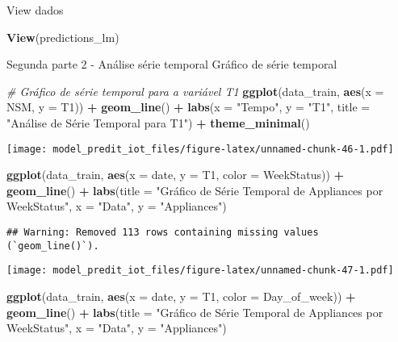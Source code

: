 \documentclass[
]{article}
\newenvironment{Shaded}{\begin{snugshade}}{\end{snugshade}}
\newcommand{\AttributeTok}[1]{\textcolor[rgb]{0.13,0.29,0.53}{#1}}
\newcommand{\CommentTok}[1]{\textcolor[rgb]{0.56,0.35,0.01}{\textit{#1}}}
\newcommand{\FunctionTok}[1]{\textcolor[rgb]{0.13,0.29,0.53}{\textbf{#1}}}
\newcommand{\NormalTok}[1]{#1}
\newcommand{\SpecialCharTok}[1]{\textcolor[rgb]{0.81,0.36,0.00}{\textbf{#1}}}
\newcommand{\StringTok}[1]{\textcolor[rgb]{0.31,0.60,0.02}{#1}}
\begin{document}
View dados

\begin{Shaded}
\begin{Highlighting}[]
\FunctionTok{View}\NormalTok{(predictions\_lm)}
\end{Highlighting}
\end{Shaded}

Segunda parte 2 - Análise série temporal Gráfico de série temporal

\begin{Shaded}
\begin{Highlighting}[]
\CommentTok{\# Gráfico de série temporal para a variável T1}
\FunctionTok{ggplot}\NormalTok{(data\_train, }\FunctionTok{aes}\NormalTok{(}\AttributeTok{x =}\NormalTok{ NSM, }\AttributeTok{y =}\NormalTok{ T1)) }\SpecialCharTok{+}
  \FunctionTok{geom\_line}\NormalTok{() }\SpecialCharTok{+}
  \FunctionTok{labs}\NormalTok{(}\AttributeTok{x =} \StringTok{"Tempo"}\NormalTok{, }\AttributeTok{y =} \StringTok{"T1"}\NormalTok{, }\AttributeTok{title =} \StringTok{"Análise de Série Temporal para T1"}\NormalTok{) }\SpecialCharTok{+}
  \FunctionTok{theme\_minimal}\NormalTok{()}
\end{Highlighting}
\end{Shaded}

\texttt{[image: model\_predit\_iot\_files/figure-latex/unnamed-chunk-46-1.pdf]}

\begin{Shaded}
\begin{Highlighting}[]
\FunctionTok{ggplot}\NormalTok{(data\_train, }\FunctionTok{aes}\NormalTok{(}\AttributeTok{x =}\NormalTok{ date, }\AttributeTok{y =}\NormalTok{ T1, }\AttributeTok{color =}\NormalTok{ WeekStatus)) }\SpecialCharTok{+}
  \FunctionTok{geom\_line}\NormalTok{() }\SpecialCharTok{+}
  \FunctionTok{labs}\NormalTok{(}\AttributeTok{title =} \StringTok{"Gráfico de Série Temporal de Appliances por WeekStatus"}\NormalTok{,}
       \AttributeTok{x =} \StringTok{"Data"}\NormalTok{,}
       \AttributeTok{y =} \StringTok{"Appliances"}\NormalTok{)}
\end{Highlighting}
\end{Shaded}

\begin{verbatim}
## Warning: Removed 113 rows containing missing values (`geom_line()`).
\end{verbatim}

\texttt{[image: model\_predit\_iot\_files/figure-latex/unnamed-chunk-47-1.pdf]}

\begin{Shaded}
\begin{Highlighting}[]
\FunctionTok{ggplot}\NormalTok{(data\_train, }\FunctionTok{aes}\NormalTok{(}\AttributeTok{x =}\NormalTok{ date, }\AttributeTok{y =}\NormalTok{ T1, }\AttributeTok{color =}\NormalTok{ Day\_of\_week)) }\SpecialCharTok{+}
  \FunctionTok{geom\_line}\NormalTok{() }\SpecialCharTok{+}
  \FunctionTok{labs}\NormalTok{(}\AttributeTok{title =} \StringTok{"Gráfico de Série Temporal de Appliances por WeekStatus"}\NormalTok{,}
       \AttributeTok{x =} \StringTok{"Data"}\NormalTok{,}
       \AttributeTok{y =} \StringTok{"Appliances"}\NormalTok{)}
\end{Highlighting}
\end{Shaded}
\end{document}

